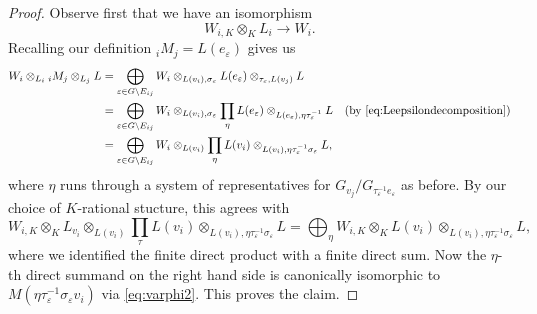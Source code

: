 \documentclass[a4paper,12pt,reqno]{amsart}
\theoremstyle{plain}
\theoremstyle{remark}
\begin{document}
  \begin{proof}
    Observe first that we have an isomorphism
    \[
    W_{i,K}\otimes_K L_i\to W_i.
    \]
    Recalling our definition ${}_iM_j=L(e_\varepsilon)$ gives us
    \begin{align*}
      W_i \otimes_{L_i} {}_iM_j\otimes_{L_j}L
      &=\bigoplus_{\varepsilon\in G\backslash E_{ij}}W_{i}\otimes_{L(v_i),\sigma_\varepsilon} L(e_\varepsilon)\otimes_{\tau_\varepsilon,L(v_j)}L\\
      &=\bigoplus_{\varepsilon\in G\backslash E_{ij}}W_{i}\otimes_{L(v_i),\sigma_\varepsilon} \prod_{\eta}L(e_\varepsilon)\otimes_{L(e_\varepsilon),\eta\tau_\varepsilon^{-1}}L&\text{(by \eqref{eq:Leepsilondecomposition})}\\
      &=\bigoplus_{\varepsilon\in G\backslash E_{ij}}W_{i}\otimes_{L(v_i)} \prod_{\eta}L(v_i)\otimes_{L(v_i),\eta\tau_\varepsilon^{-1}\sigma_\varepsilon}L,
    \end{align*}
    where $\eta$ runs through a system of representatives for $G_{v_j}/G_{\tau_\varepsilon^{-1}e_\varepsilon}$ as before. By our choice of $K$-rational stucture, this agrees with
    \[
    W_{i,K}\otimes_K L_{v_i}\otimes_{L(v_i)} \prod_{\tau}L(v_i)\otimes_{L(v_i),\eta\tau_\varepsilon^{-1}\sigma_\varepsilon}L=
    \bigoplus_\eta W_{i,K}\otimes_K L(v_i)\otimes_{L(v_i),\eta\tau_\varepsilon^{-1}\sigma_\varepsilon}L,
    \]
    where we identified the finite direct product with a finite direct sum. Now the $\eta$-th direct summand on the right hand side is canonically isomorphic to $M(\eta\tau_\varepsilon^{-1}\sigma_\varepsilon v_i)$ via \eqref{eq:varphi2}. This proves the claim.
  \end{proof}
\end{document}
